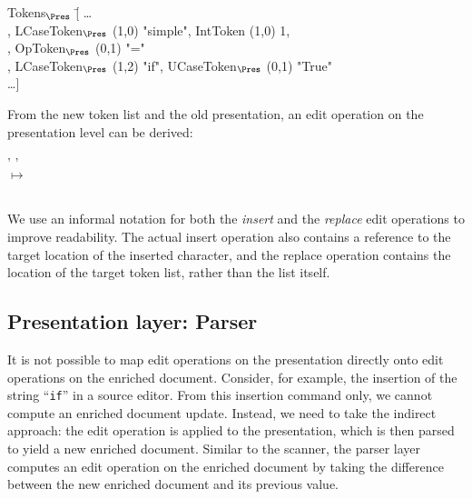 \small \ttfamily
\begin{tabbing}
Tokens$_{\Pres}$ \= [ \dots \\
                           \> , LCaseToken$_{\Pres}$ (1,0) "simple", IntToken (1,0) 1,\\
                           \> , OpToken$_{\Pres}$ (0,1) "="\\
                           \> , LCaseToken$_{\Pres}$ (1,2) "if", UCaseToken$_{\Pres}$ (0,1) "True"\\
                           \> \dots ]                      
\end{tabbing}
\rmfamily \normalsize
 
From the new token list and the old presentation, an edit operation on the presentation level can be derived:

\small \ttfamily
\begin{tabbing}
 \ttfamily ' ' \\
$\mapsto$\\
 \\  
  
\end{tabbing}
\rmfamily \normalsize

We use an informal notation for both the {\em insert} and the {\em replace} edit operations to improve readability. The actual insert operation also contains a reference to the target location of the inserted character, and the replace operation contains the location of the target token list, rather than the list itself. 


%																
\subsection{Presentation layer: Parser} \label{sect:parser}
        

It is not possible to map edit operations on the presentation directly onto edit operations on the enriched document. Consider, for example, the insertion of the string ``\verb|if|'' in a source editor. From this insertion command only, we cannot compute an enriched document update. Instead, we need to take the indirect approach: the edit operation is applied to the presentation, which is then parsed to yield a new enriched document. Similar to the scanner, the parser layer computes an edit operation on the enriched document by taking the difference between the new enriched document and its previous value. 

